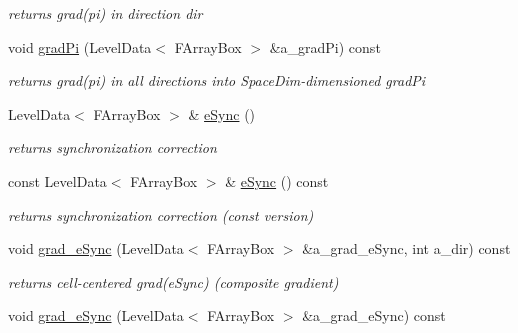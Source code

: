 \begin{DoxyCompactItemize}
\begin{DoxyCompactList}\small\item\em returns grad(pi) in direction dir \end{DoxyCompactList}\item 
\hypertarget{class_c_c_projector_comp_a04eb7978d69c89123bd4c50102633fff}{void \hyperlink{class_c_c_projector_comp_a04eb7978d69c89123bd4c50102633fff}{grad\-Pi} (Level\-Data$<$ F\-Array\-Box $>$ \&a\-\_\-grad\-Pi) const }\label{class_c_c_projector_comp_a04eb7978d69c89123bd4c50102633fff}

\begin{DoxyCompactList}\small\item\em returns grad(pi) in all directions into Space\-Dim-\/dimensioned grad\-Pi \end{DoxyCompactList}\item 
\hypertarget{class_c_c_projector_comp_af8f4911cca7fd757c68de3265960ddae}{Level\-Data$<$ F\-Array\-Box $>$ \& \hyperlink{class_c_c_projector_comp_af8f4911cca7fd757c68de3265960ddae}{e\-Sync} ()}\label{class_c_c_projector_comp_af8f4911cca7fd757c68de3265960ddae}

\begin{DoxyCompactList}\small\item\em returns synchronization correction \end{DoxyCompactList}\item 
\hypertarget{class_c_c_projector_comp_ab3b3f0744c5e8697c861f1272d85b99a}{const Level\-Data$<$ F\-Array\-Box $>$ \& \hyperlink{class_c_c_projector_comp_ab3b3f0744c5e8697c861f1272d85b99a}{e\-Sync} () const }\label{class_c_c_projector_comp_ab3b3f0744c5e8697c861f1272d85b99a}

\begin{DoxyCompactList}\small\item\em returns synchronization correction (const version) \end{DoxyCompactList}\item 
\hypertarget{class_c_c_projector_comp_a2cf5251f4068e41208b40811d942861e}{void \hyperlink{class_c_c_projector_comp_a2cf5251f4068e41208b40811d942861e}{grad\-\_\-e\-Sync} (Level\-Data$<$ F\-Array\-Box $>$ \&a\-\_\-grad\-\_\-e\-Sync, int a\-\_\-dir) const }\label{class_c_c_projector_comp_a2cf5251f4068e41208b40811d942861e}

\begin{DoxyCompactList}\small\item\em returns cell-\/centered grad(e\-Sync) (composite gradient) \end{DoxyCompactList}\item 
\hypertarget{class_c_c_projector_comp_a01cd01598dd1246e5c48d315f36fef43}{void \hyperlink{class_c_c_projector_comp_a01cd01598dd1246e5c48d315f36fef43}{grad\-\_\-e\-Sync} (Level\-Data$<$ F\-Array\-Box $>$ \&a\-\_\-grad\-\_\-e\-Sync) const }\label{class_c_c_projector_comp_a01cd01598dd1246e5c48d315f36fef43}


\end{DoxyCompactItemize}
